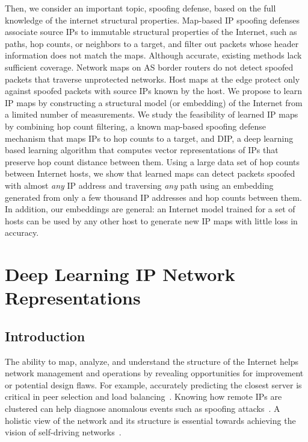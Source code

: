 Then, we consider an important topic, spoofing defense,  based on the full knowledge of the internet structural properties.  Map-based IP spoofing defenses associate source IPs to immutable structural properties of the Internet, such as paths, hop counts, or neighbors to a target, and filter out packets whose header information does not match the maps. Although accurate, existing methods lack sufficient coverage. Network maps on AS border routers do not detect spoofed packets that traverse unprotected networks. Host maps at the edge protect only against spoofed packets with source IPs known by the host. 
%
We propose to learn IP maps by constructing a structural model (or embedding) of the Internet from a limited number of measurements.  
%
We study the feasibility of learned IP maps by combining hop count filtering, a known map-based spoofing defense mechanism that maps IPs to hop counts to a target, and DIP, a deep learning based learning algorithm that computes vector representations of IPs that preserve hop count distance between them. 
%
Using a large data set of hop counts between Internet hosts, we show that learned maps can detect packets spoofed with almost {\em any} IP address and traversing {\em any} path using an embedding generated from only a few thousand IP addresses and hop counts between them.
%
In addition, our embeddings are general: an Internet model trained for a set of hosts can be used by any other host to generate new IP maps with little loss in accuracy. 

\section{Deep Learning IP Network Representations}
\subsection{Introduction}
\label{dip:intro}

The ability to map, analyze, and understand the structure of the Internet helps network management and operations by revealing opportunities for improvement or potential design flaws. For example, accurately predicting the closest server is critical in peer selection and load balancing~\citep{silkroad}. Knowing how remote IPs are clustered can help diagnose anomalous events such as spoofing attacks~\citep{hc-filter}. A holistic view of the network and its structure is essential towards achieving the  vision of self-driving networks~\citep{self-driving}. 

